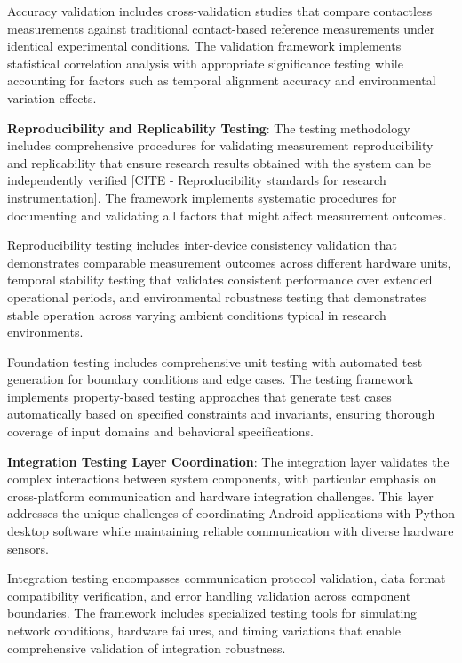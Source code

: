 \documentclass[12pt,a4paper]{report}
\begin{document}
Accuracy validation includes cross-validation studies that compare contactless measurements against traditional
contact-based reference measurements under identical experimental conditions. The validation framework implements
statistical correlation analysis with appropriate significance testing while accounting for factors such as temporal
alignment accuracy and environmental variation effects.

\textbf{Reproducibility and Replicability Testing}: The testing methodology includes comprehensive procedures for validating
measurement reproducibility and replicability that ensure research results obtained with the system can be independently
verified [CITE - Reproducibility standards for research instrumentation]. The framework implements systematic procedures
for documenting and validating all factors that might affect measurement outcomes.

Reproducibility testing includes inter-device consistency validation that demonstrates comparable measurement outcomes
across different hardware units, temporal stability testing that validates consistent performance over extended
operational periods, and environmental robustness testing that demonstrates stable operation across varying ambient
conditions typical in research environments.

Foundation testing includes comprehensive unit testing with automated test generation for boundary conditions and edge
cases. The testing framework implements property-based testing approaches that generate test cases automatically based
on specified constraints and invariants, ensuring thorough coverage of input domains and behavioral specifications.

\textbf{Integration Testing Layer Coordination}: The integration layer validates the complex interactions between system
components, with particular emphasis on cross-platform communication and hardware integration challenges. This layer
addresses the unique challenges of coordinating Android applications with Python desktop software while maintaining
reliable communication with diverse hardware sensors.

Integration testing encompasses communication protocol validation, data format compatibility verification, and error
handling validation across component boundaries. The framework includes specialized testing tools for simulating network
conditions, hardware failures, and timing variations that enable comprehensive validation of integration robustness.
\end{document}
